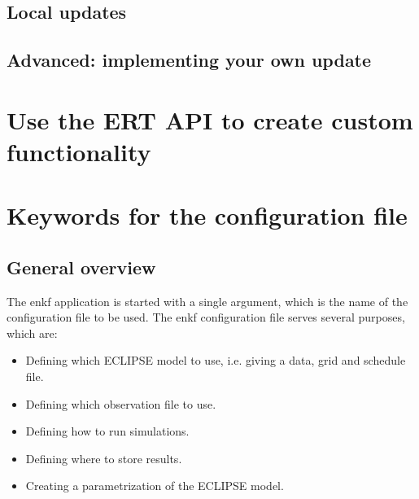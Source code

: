 \documentclass[letterpaper,10pt,english]{sphinxmanual}
\begin{document}
\section{Local updates}
\label{\detokenize{update/index:local-updates}}

\section{Advanced: implementing your own update}
\label{\detokenize{update/index:advanced-implementing-your-own-update}}

\chapter{Use the ERT API to create custom functionality}
\label{\detokenize{scripting/index:use-the-ert-api-to-create-custom-functionality}}\label{\detokenize{scripting/index::doc}}

\chapter{Keywords for the configuration file}
\label{\detokenize{keywords/index::doc}}\label{\detokenize{keywords/index:ert-kw-full-doc}}\label{\detokenize{keywords/index:keywords-for-the-configuration-file}}


\section{General overview}
\label{\detokenize{keywords/index:general-overview}}
The enkf application is started with a single argument, which is the name of the
configuration file to be used. The enkf configuration file serves several
purposes, which are:
\begin{itemize}
\item {} 
Defining which ECLIPSE model to use, i.e. giving a data, grid and schedule file.

\item {} 
Defining which observation file to use.

\item {} 
Defining how to run simulations.

\item {} 
Defining where to store results.

\item {} 
Creating a parametrization of the ECLIPSE model.

\end{itemize}
\end{document}
